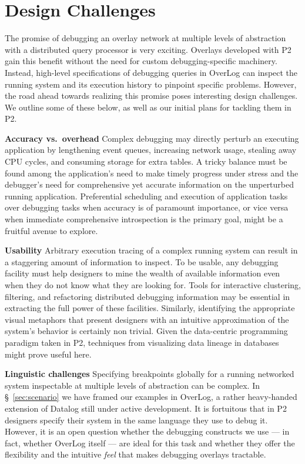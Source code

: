\documentclass[10pt,twocolumn]{article}
\def\Sys{P2\xspace}
\def\Lang{OverLog\xspace}
\begin{document}
\section{Design Challenges}
\label{sec:design}

The promise of debugging an overlay network at multiple levels of abstraction with a
distributed query processor is very exciting.  Overlays developed with
\Sys gain this benefit without
the need for custom debugging-specific machinery.  Instead, high-level
specifications of debugging queries in \Lang can inspect the running
system and its execution history to pinpoint specific problems.
However, the road ahead towards realizing
this promise poses interesting design challenges.
We
outline some of these below, as well as our initial plans for
tackling them in \Sys.

{\bf Accuracy vs.\ overhead} Complex debugging may directly perturb an
executing application by lengthening event queues, increasing network
usage, stealing away CPU cycles, and consuming storage for extra tables.
A tricky balance must be found among the application's need to make
timely progress under stress and the debugger's need for comprehensive
yet accurate information on the unperturbed running application.
Preferential scheduling and execution of application tasks over
debugging tasks when accuracy is of paramount importance, or vice versa
when immediate comprehensive introspection is the primary goal, might be
a fruitful avenue to explore.

{\bf Usability} Arbitrary execution tracing of a complex running system
can result in a staggering amount of information to inspect.  To be
usable, any debugging facility must help designers to mine the wealth of
available information even when they do not know what they are looking
for.  Tools for interactive clustering, filtering, and refactoring
distributed debugging information may be essential in extracting the
full power of these facilities. Similarly, identifying the appropriate
visual metaphors that present designers with an intuitive
approximation of the system's behavior is certainly non trivial. Given the data-centric
programming paradigm taken in \Sys, techniques from visualizing data
lineage in databases~\cite{Woodruff1997} might prove useful here.

{\bf Linguistic challenges} Specifying breakpoints globally for a
running networked system inspectable at multiple levels of abstraction
can be complex.  In \S~\ref{sec:scenario} we have framed our examples in
\Lang, a rather heavy-handed extension of Datalog still under active
development.  It is fortuitous that in \Sys designers
specify their system in the same language they use to debug it.
However, it is an
open question whether the debugging constructs we use --- in
fact, whether \Lang itself --- are ideal for this task and whether they
offer the flexibility and the intuitive
\emph{feel} that makes debugging overlays tractable.
\end{document}
